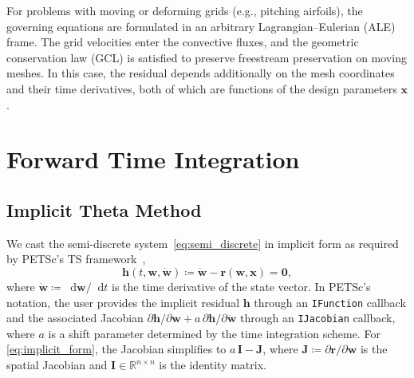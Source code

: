 \documentclass[journal]{new-aiaa}
\newcommand{\mb}[1]{\mathbf{#1}}
\renewcommand{\d}{\mathop{}\!\mathrm{d}} %
\newcommand{\p}{\partial}
\begin{document}
For problems with moving or deforming grids (e.g., pitching airfoils), the governing equations are formulated in an arbitrary Lagrangian--Eulerian (ALE) frame.
The grid velocities enter the convective fluxes, and the geometric conservation law (GCL) is satisfied to preserve freestream preservation on moving meshes.
In this case, the residual depends additionally on the mesh coordinates and their time derivatives, both of which are functions of the design parameters $\mb{x}$.

\section{Forward Time Integration}\label{sec:forward}

\subsection{Implicit Theta Method}\label{sec:theta_method}
We cast the semi-discrete system~\eqref{eq:semi_discrete} in implicit form as required by PETSc's TS framework~\cite{Zhang2022},
\begin{equation}\label{eq:implicit_form}
\mb{h}(t, \mb{w}, \dot{\mb{w}}) \coloneqq \dot{\mb{w}} - \mb{r}(\mb{w}, \mb{x}) = \mb{0},
\end{equation}
where $\dot{\mb{w}} \coloneqq \d \mb{w} / \d t$ is the time derivative of the state vector.
In PETSc's notation, the user provides the implicit residual $\mb{h}$ through an \texttt{IFunction} callback and the associated Jacobian $\p \mb{h}/\p \mb{w} + a \, \p \mb{h}/\p \dot{\mb{w}}$ through an \texttt{IJacobian} callback, where $a$ is a shift parameter determined by the time integration scheme.
For \cref{eq:implicit_form}, the Jacobian simplifies to $a \, \mb{I} - \mb{J}$, where $\mb{J} \coloneqq \p \mb{r}/\p \mb{w}$ is the spatial Jacobian and $\mb{I} \in \mathbb{R}^{n \times n}$ is the identity matrix.
\end{document}
